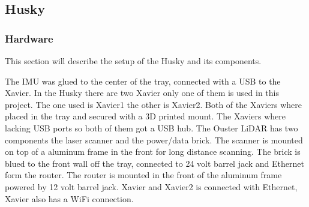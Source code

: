 \subsection{Husky}
\subsubsection{Hardware}
This section will describe the setup of the Husky and its components. 

The IMU was glued to the center of the tray, connected with a USB to the Xavier. 
In the Husky there are two Xavier only one of them is used in this project. The one used is Xavier1 the other is Xavier2. Both of the Xaviers where placed in the tray and secured with a 3D printed mount. The Xaviers where lacking USB ports so both of them got a USB hub. 
The Ouster LiDAR has two components the laser scanner and the power/data brick. The scanner is mounted on top of a aluminum frame in the front for long distance scanning. The brick is blued to the front wall off the tray, connected to 24 volt barrel jack and Ethernet form the router. 
The router is mounted in the front of the aluminum frame powered by 12 volt barrel jack. Xavier and Xavier2 is connected with Ethernet, Xavier also has a WiFi connection. 
